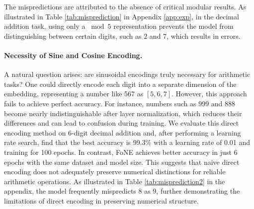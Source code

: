 The mispredictions are attributed to the absence of critical modular results. As illustrated in Table \ref{tab:misprediction} in Appendix \ref{app:exp}, in the decimal addition task, using only a $\bmod 5$ representation prevents the model from distinguishing between certain digits, such as $2$ and $7$, which results in errors. 

\paragraph{Necessity of Sine and Cosine Encoding.} 
A natural question arises: are sinusoidal encodings truly necessary for arithmetic tasks? One could directly encode each digit into a separate dimension of the embedding, representing a number like 567 as \([5,6,7]\). However, this approach fails to achieve perfect accuracy. For instance, numbers such as $999$ and $888$ become nearly indistinguishable after layer normalization, which reduces their differences and can lead to confusion during training. We evaluate this direct encoding method on 6-digit decimal addition and, after performing a learning rate search, find that the best accuracy is 99.3\% with a learning rate of 0.01 and training for 100 epochs. In contrast, FoNE  achieves better accuracy in just 6 epochs with the same dataset and model size. This suggests that naive direct encoding does not adequately preserve numerical distinctions for reliable arithmetic operations. As illustrated in Table \ref{tab:misprediction2} in the appendix, the model frequently mispredicts 8 as 9, further demonstrating the limitations of direct encoding in preserving numerical structure.
